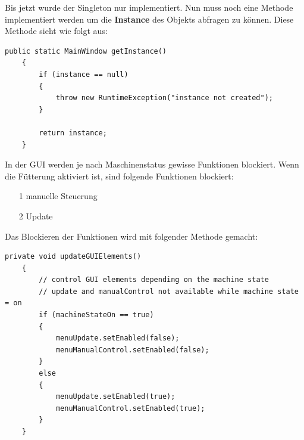 \newpage

Bis jetzt wurde der Singleton nur implementiert. Nun muss noch eine Methode implementiert werden um die \textbf{Instance} des Objekts abfragen zu können. Diese Methode sieht wie folgt aus:
\begin{lstlisting}[style=JavaStyle, caption=MainWindow.getInstance()]
public static MainWindow getInstance()
    {
        if (instance == null)
        {
            throw new RuntimeException("instance not created");
        }

        return instance;
    }
\end{lstlisting}

\vspace{10pt}

In der \ac{GUI} werden je nach Maschinenstatus gewisse Funktionen blockiert. Wenn die Fütterung aktiviert ist, sind folgende Funktionen blockiert:
\begin{itemize}
\item[1] manuelle Steuerung
\item[2] Update
\end{itemize}
Das Blockieren der Funktionen wird mit folgender Methode gemacht:
\begin{lstlisting}[style=JavaStyle, caption=GUI Elemente blockieren]
private void updateGUIElements()
    {
        // control GUI elements depending on the machine state
        // update and manualControl not available while machine state = on 
        if (machineStateOn == true)
        {
            menuUpdate.setEnabled(false);
            menuManualControl.setEnabled(false);
        }
        else
        {
            menuUpdate.setEnabled(true);
            menuManualControl.setEnabled(true);
        }
    }
\end{lstlisting}

\newpage


